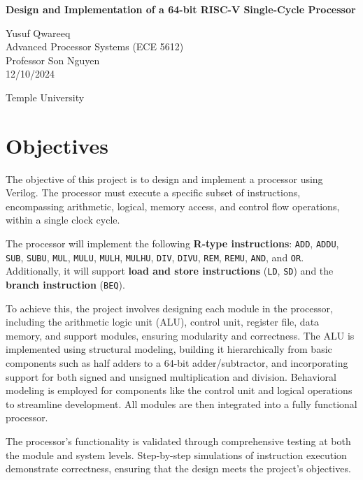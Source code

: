 \documentclass[12pt]{article}
\begin{document}
\begin{titlepage}
    \centering
    \vspace*{1in}
    
    \Huge
    \textbf{Design and Implementation of a 64-bit RISC-V Single-Cycle Processor}
    
    \vspace{0.5in}
    
    \Large
    Yusuf Qwareeq \\ 
    Advanced Processor Systems (ECE 5612) \\ 
    Professor Son Nguyen \\ 
    12/10/2024
    
    \vfill
    
    \Large
    Temple University
\end{titlepage}

\section*{Objectives}

The objective of this project is to design and implement a processor using Verilog. The processor must execute a specific subset of instructions, encompassing arithmetic, logical, memory access, and control flow operations, within a single clock cycle.

The processor will implement the following \textbf{R-type instructions}: \texttt{ADD}, \texttt{ADDU}, \texttt{SUB}, \texttt{SUBU}, \texttt{MUL}, \texttt{MULU}, \texttt{MULH}, \texttt{MULHU}, \texttt{DIV}, \texttt{DIVU}, \texttt{REM}, \texttt{REMU}, \texttt{AND}, and \texttt{OR}. Additionally, it will support \textbf{load and store instructions} (\texttt{LD}, \texttt{SD}) and the \textbf{branch instruction} (\texttt{BEQ}).

To achieve this, the project involves designing each module in the processor, including the arithmetic logic unit (ALU), control unit, register file, data memory, and support modules, ensuring modularity and correctness. The ALU is implemented using structural modeling, building it hierarchically from basic components such as half adders to a 64-bit adder/subtractor, and incorporating support for both signed and unsigned multiplication and division. Behavioral modeling is employed for components like the control unit and logical operations to streamline development. All modules are then integrated into a fully functional processor.

The processor's functionality is validated through comprehensive testing at both the module and system levels. Step-by-step simulations of instruction execution demonstrate correctness, ensuring that the design meets the project's objectives.
\end{document}
